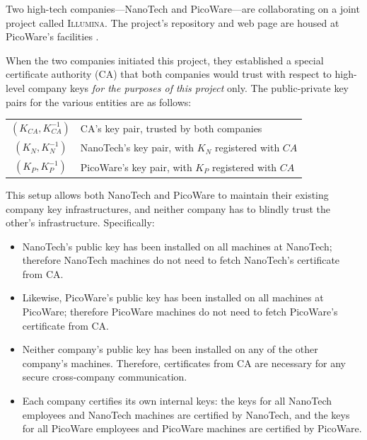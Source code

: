 \begin{exercise}[\synthesis]
  Two high-tech companies---\textsf{NanoTech} and
  \textsf{PicoWare}---are collaborating on a joint project called
  \textsc{Illumina}.  The project's repository and web page are housed
  at \textsf{PicoWare}'s facilities .

  When the two companies initiated this project, they established a
  special certificate authority (CA) that both companies would trust
  with respect to high-level company keys \emph{for the purposes of this
    project} only.   The public-private key pairs for the various
  entities are as follows: 

  \begin{center}
  \begin{tabular}{cl}
    $(K_{CA},K^{-1}_{CA})$ &  CA's key pair, trusted by both companies
    \\
    $(K_{N},K^{-1}_{N})$ &  \textsf{NanoTech}'s key pair, with $K_N$ registered
    with $CA$ \\
    $(K_{P},K^{-1}_{P})$ &  \textsf{PicoWare}'s key pair, with $K_P$ registered
    with $CA$ 
  \end{tabular}
  \end{center}
  This setup allows both \textsf{NanoTech} and \textsf{PicoWare} to maintain
  their existing company key infrastructures, and neither company has to
  blindly trust the other's infrastructure.  Specifically:
  \begin{itemize}
  \item \textsf{NanoTech}'s public key has been installed on all machines at
    \textsf{NanoTech}; therefore \textsf{NanoTech} machines do not need to
    fetch \textsf{NanoTech}'s 
    certificate from CA. 
  \item Likewise, \textsf{PicoWare}'s public key has been installed on all
    machines at \textsf{PicoWare}; therefore \textsf{PicoWare} machines do
    not need to fetch
    \textsf{PicoWare}'s certificate from CA.
  \item Neither company's public key has been installed on any of the
    other company's machines.  Therefore, certificates from CA are
    necessary for any secure cross-company communication.
  \item Each company certifies its own internal keys: the keys for all
    \textsf{NanoTech} employees and \textsf{NanoTech} machines are
    certified by \textsf{NanoTech}, and the keys for all
    \textsf{PicoWare} employees and \textsf{PicoWare} machines are
    certified by \textsf{PicoWare}.
  \end{itemize}


\end{exercise}
